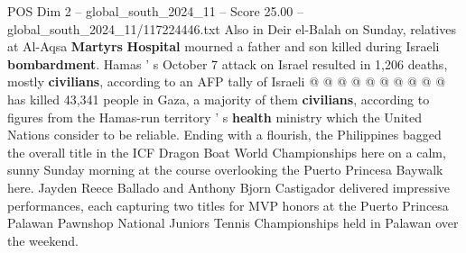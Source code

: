 \begin{textsample}{POS Dim 2 – global\_south\_2024\_11 – Score 25.00 – global\_south\_2024\_11/117224446.txt}
Also in Deir el-Balah on Sunday, relatives at Al-Aqsa \textbf{Martyrs} \textbf{Hospital} mourned a father and son killed during Israeli \textbf{bombardment}.
Hamas ' s October 7 attack on Israel resulted in 1,206 deaths, mostly \textbf{civilians}, according to an AFP tally of Israeli @ @ @ @ @ @ @ @ @ @ has killed 43,341 people in Gaza, a majority of them \textbf{civilians}, according to figures from the Hamas-run territory ' s \textbf{health} ministry which the United Nations consider to be reliable.
Ending with a flourish, the Philippines bagged the overall title in the ICF Dragon Boat World Championships here on a calm, sunny Sunday morning at the course overlooking the Puerto Princesa Baywalk here.
Jayden Reece Ballado and Anthony Bjorn Castigador delivered impressive performances, each capturing two titles for MVP honors at the Puerto Princesa Palawan Pawnshop National Juniors Tennis Championships held in Palawan over the weekend.

\end{textsample}
